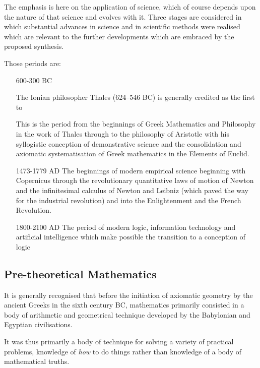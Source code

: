 \documentclass[10pt,titlepage]{book}
\begin{document}
The emphasis is here on the application of science, which of course depends upon the nature of that science and evolves with it.
Three stages are considered in which substantial advances in science and in scientific methods were realised which are relevant to the further developments which are embraced by the proposed synthesis.

Those periods are:


\begin{itemize}

\item[600-300 BC]

  The Ionian philosopher Thales (624–546 BC) is generally credited as the first to 

  This is the period from the beginnings of Greek Mathematics and Philosophy in the work of Thales through to the philosophy of Aristotle with his syllogistic conception of demonstrative science and the consolidation and axiomatic systematisation of Greek mathematics in the Elements of Euclid.

\item[1473-1779 AD] The beginnings of modern empirical science beginning with Copernicus through the revolutionary quantitative laws of motion of Newton and the infinitesimal calculus of Newton and Leibniz (which paved the way for the industrial revolution) and into the Enlightenment and the French Revolution.

\item[1800-2100 AD] The period of modern logic, information technology and artificial intelligence which make possible the transition to a conception of logic

\end{itemize}



\subsection{Pre-theoretical Mathematics}

It is generally recognised that before the initiation of axiomatic geometry by the ancient Greeks in the sixth century BC, mathematics primarily consisted in a body of arithmetic and geometrical technique developed by the Babylonian and Egyptian civilisations.

It was thus primarily a body of technique for solving a variety of practical problems, knowledge of \emph{how} to do things rather than knowledge of a body of mathematical truths.
\end{document}
